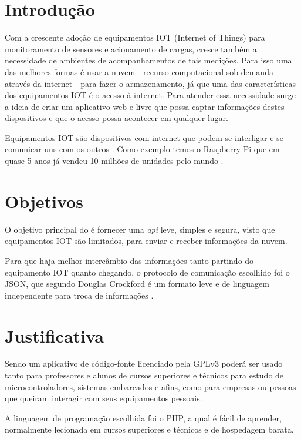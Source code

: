 \section{Introdução}\label{introduuxe7uxe3o}

Com a crescente adoção de equipamentos IOT (Internet of Things) para
monitoramento de sensores e acionamento de cargas, cresce também a
necessidade de ambientes de acompanhamentos de tais medições. Para isso
uma das melhores formas é usar a nuvem - recurso computacional sob
demanda através da internet \cite{ibm-cloud:2015} - para fazer o
armazenamento, já que uma das características dos equipamentos IOT é o
acesso à internet. Para atender essa necessidade surge a ideia de criar
um aplicativo web e livre que possa captar informações destes
dispositivos e que o acesso possa acontecer em qualquer lugar.

Equipamentos IOT são dispositivos com internet que podem se interligar e
se comunicar uns com os outros \cite{revell:2013}. Como exemplo temos o
Raspberry Pi que em quase 5 anos já vendeu 10 milhões de unidades pelo
mundo \cite{raspberry-pi-blog:2016}.

\section{Objetivos}\label{objetivos}

O objetivo principal do \wm é fornecer uma \emph{api} leve, simples e
segura, visto que equipamentos IOT são limitados, para enviar e receber
informações da nuvem.

Para que haja melhor intercâmbio das informações tanto partindo do
equipamento IOT quanto chegando, o protocolo de comunicação escolhido
foi o JSON, que segundo Douglas Crockford é um formato leve e de
linguagem independente para troca de informações \cite{crockford-2015}.

\section{Justificativa}\label{justificativa}

Sendo um aplicativo de código-fonte licenciado pela GPLv3 poderá ser
usado tanto para professores e alunos de cursos superiores e técnicos
para estudo de microcontroladores, sistemas embarcados e afins, como
para empresas ou pessoas que queiram interagir com seus equipamentos
pessoais.

A linguagem de programação escolhida foi o PHP, a qual é fácil de
aprender, normalmente lecionada em cursos superiores e técnicos e de
hospedagem barata.

